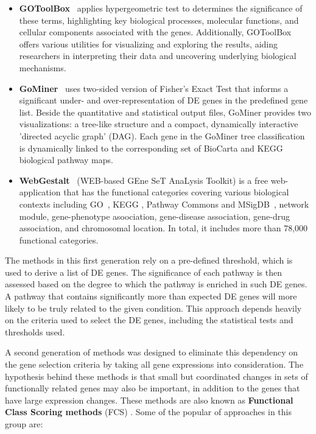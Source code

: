 \begin{itemize}
\item \textbf{GOToolBox}~\cite{Martin:2004} applies hypergeometric test to determines the significance of these terms, highlighting key biological processes, molecular functions, and cellular components associated with the genes. Additionally, GOToolBox offers various utilities for visualizing and exploring the results, aiding researchers in interpreting their data and uncovering underlying biological mechanisms.

\item \textbf{GoMiner}~\cite{GoMiner, Zeeberg:2005} uses two-sided version of Fisher's Exact Test that informs a significant under- and over-representation of DE genes in the predefined gene list. Beside the quantitative and statistical output files, GoMiner provides two visualizations: a tree-like structure and a compact, dynamically interactive 'directed acyclic graph' (DAG). Each gene in the GoMiner tree classification is dynamically linked to the corresponding set of BioCarta and KEGG biological pathway maps.

\item \textbf{WebGestalt}~\cite{zhang2005webgestalt, wang2013web} (WEB-based GEne SeT AnaLysis Toolkit) is a free web-application that has the functional categories covering various biological contexts including GO~\cite{Ashburner:2000}, KEGG \cite{kanehisa:2008}, Pathway Commons \cite{cerami2011pathway} and MSigDB~\cite{liberzon2011molecular}, network module, gene-phenotype asoociation, gene-disease association, gene-drug association, and chromosomal location. In total, it includes more than 78,000 functional categories.

\end{itemize}

The methods in this first generation rely on a pre-defined threshold, which is used to derive a list of DE genes. The significance of each pathway is then assessed based on the degree to which the pathway is enriched in such DE genes. A pathway that contains significantly more than expected DE genes will more likely to be truly related to the given condition.  
This approach depends heavily on the criteria used to select the DE genes, including the statistical tests and thresholds used. 


A second generation of methods was designed to eliminate this dependency on the gene selection  criteria by taking all gene expressions into consideration. 
The hypothesis behind these methods is that small but coordinated changes in sets of functionally related genes may also be important, in addition to the genes that have large expression changes.
These methods are also known as \textbf{Functional Class Scoring methods} (FCS) \cite{ackermann2009general}.
Some of the popular of approaches in this group are:

